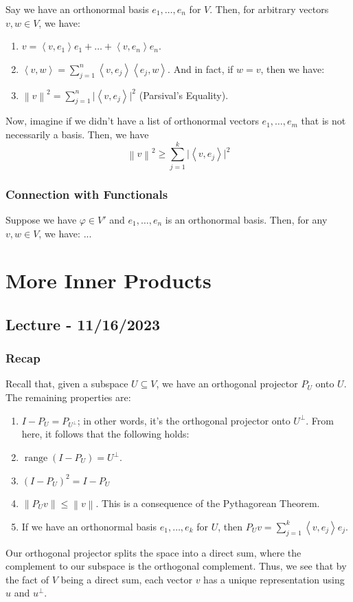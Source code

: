 \documentclass[openany]{book}
\newcommand{\norm}[1]{\left\lVert{#1}\right\rVert}
\DeclareMathOperator*{\vrange}{range}
\newcommand{\innerproduct}[2]{\left\langle{#1}, {#2}\right\rangle}
\begin{document}
Say we have an orthonormal basis $e_{1}, \ldots, e_{n}$ for $V$. Then, for arbitrary vectors $v,w \in V$, we have:
\begin{enumerate}
	\item $v = \innerproduct{v}{e_{1}}e_{1} + \ldots + \innerproduct{v}{e_{n}}e_{n}$.
	\item $\innerproduct{v}{w} = \sum_{j=1}^{n} \innerproduct{v}{e_{j}} \innerproduct{e_{j}}{w}$. And in fact, if $w = v$, then we have:
	\item $\norm{v}^{2} = \sum_{j=1}^{n} \lvert \innerproduct{v}{e_{j}} \rvert^{2}$ (Parsival's Equality).
\end{enumerate}

Now, imagine if we didn't have a list of orthonormal vectors $e_{1}, \ldots, e_{m}$ that is not necessarily a basis. Then, we have
\begin{equation*}
	\norm{v}^{2} \geq \sum_{j=1}^{k} \lvert \innerproduct{v}{e_{j}} \rvert^{2}
\end{equation*}

\subsection{Connection with Functionals}

Suppose we have $\varphi \in V'$ and $e_{1}, \ldots, e_{n}$ is an orthonormal basis. Then, for any $v, w \in V$, we have:
...

\chapter{More Inner Products}
\section{Lecture - 11/16/2023}
\subsection{Recap}
Recall that, given a subspace $U \subseteq V$, we have an orthogonal projector $P_{U}$ onto $U$. The remaining properties are:
\begin{enumerate}
	\item $I - P_{U} = P_{U^{\perp}}$; in other words, it's the orthogonal projector onto $U^{\perp}$. From here, it follows that the following holds:
	\item $\vrange (I - P_{U}) = U^{\perp}$.
	\item $(I - P_{U})^{2} = I - P_{U}$
	\item $\norm{P_{U}v} \leq \norm{v}$. This is a consequence of the Pythagorean Theorem.
	\item If we have an orthonormal basis $e_{1}, \ldots, e_{k}$ for $U$, then $P_{U}v = \sum_{j=1}^{k} \innerproduct{v}{e_{j}}e_{j}$.
\end{enumerate}
\begin{rmk}
	Our orthogonal projector splits the space into a direct sum, where the complement to our subspace is the orthogonal complement. Thus, we see that by the fact of $V$ being a direct sum, each vector $v$ has a unique representation using $u$ and $u^{\perp}$.
\end{rmk}
\end{document}
